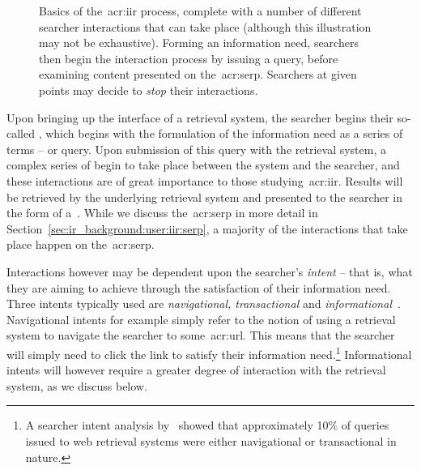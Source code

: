 \begin{figure}[t!]
    \centering
    \caption[Basics of the~\gls{acr:iir} process]{Basics of the~\gls{acr:iir} process, complete with a number of different searcher interactions that can take place (although this illustration may not be exhaustive). Forming an information need, searchers then begin the interaction process by issuing a query, before examining content presented on the~\gls{acr:serp}. Searchers at given points may decide to \emph{stop} their interactions.}
    \label{fig:iir}
\end{figure}

Upon bringing up the interface of a retrieval system, the searcher begins their so-called , which begins with the formulation of the information need as a series of terms -- or query. Upon submission of this query with the retrieval system, a complex series of  begin to take place between the system and the searcher, and these interactions are of great importance to those studying~\gls{acr:iir}. Results will be retrieved by the underlying retrieval system and presented to the searcher in the form of a~. While we discuss the~\gls{acr:serp} in more detail in Section~\ref{sec:ir_background:user:iir:serp}, a majority of the interactions that take place happen on the~\gls{acr:serp}.

Interactions however may be dependent upon the searcher's \emph{intent} -- that is, what they are aiming to achieve through the satisfaction of their information need. Three intents typically used are \emph{navigational, transactional} and \emph{informational}~\citep{jansen2008intents}. Navigational intents for example simply refer to the notion of using a retrieval system to navigate the searcher to some~\gls{acr:url}. This means that the searcher will simply need to click the link to satisfy their information need.\footnote{A searcher intent analysis by~\cite{jansen2008intents} showed that approximately 10\% of queries issued to web retrieval systems were either navigational or transactional in nature.} Informational intents will however require a greater degree of interaction with the retrieval system, as we discuss below.

